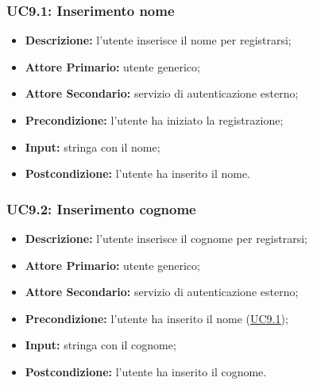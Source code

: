 \subsubsection{UC9.1: Inserimento nome}
\label{sec:UC9.1}
\begin{itemize}
    \item \textbf{Descrizione:} l'utente inserisce il nome per registrarsi;
    \item \textbf{Attore Primario:} utente generico;
    \item \textbf{Attore Secondario:} servizio di autenticazione esterno;
    \item \textbf{Precondizione:} l'utente ha iniziato la registrazione;
    \item \textbf{Input:} stringa con il nome;
    \item \textbf{Postcondizione:} l'utente ha inserito il nome.
\end{itemize}

\subsubsection{UC9.2: Inserimento cognome}
\label{sec:UC9.2}
\begin{itemize}
    \item \textbf{Descrizione:} l'utente inserisce il cognome per registrarsi;
    \item \textbf{Attore Primario:} utente generico;
    \item \textbf{Attore Secondario:} servizio di autenticazione esterno;
    \item \textbf{Precondizione:} l'utente ha inserito il nome (\hyperref[sec:UC9.1]{\underline{UC9.1}});
    \item \textbf{Input:} stringa con il cognome;
    \item \textbf{Postcondizione:} l'utente ha inserito il cognome.
\end{itemize}


